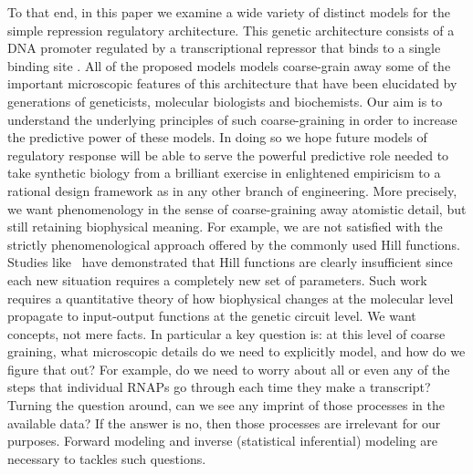 To that end, in this paper we examine a wide variety of distinct models for the
simple repression regulatory architecture. This genetic architecture consists of
a DNA promoter regulated by a transcriptional repressor that binds to a single
binding site \cite{Garcia2011a}. All of the proposed models models coarse-grain
away some of the important microscopic features of this architecture that have
been elucidated by generations of geneticists, molecular biologists and
biochemists.
Our aim is to understand the underlying principles of such coarse-graining
in order to increase the predictive power of these models. In doing so we hope
future models of regulatory response will be able to serve the powerful
predictive role needed to take synthetic biology from a brilliant exercise in
enlightened empiricism to a rational design framework as  in any other branch of
engineering.
More precisely, we want phenomenology in the sense of coarse-graining away
atomistic detail, but still retaining biophysical meaning. For example, we are
not satisfied with the strictly phenomenological approach offered by the
commonly used Hill functions. Studies like~\cite{Razo-Mejia2018} have
demonstrated that Hill functions are clearly insufficient since each new
situation requires a completely new set of parameters. Such work requires a
quantitative theory of how biophysical changes at the molecular level propagate
to input-output functions at the genetic circuit level. We want concepts, not
mere facts. In particular a key question is: at this level of coarse graining,
what microscopic details do we need to explicitly model, and how do we figure
that out? For example, do we need to worry about all or even any of the steps
that individual RNAPs go through each time they make a transcript? Turning the
question around, can we see any imprint of those processes in the available
data? If the answer is no, then those processes are irrelevant for our purposes.
Forward modeling and inverse (statistical inferential) modeling are necessary to 
tackles such questions.


